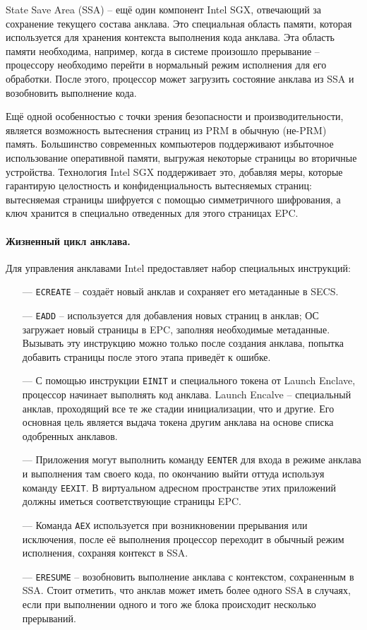State Save Area (SSA) -- ещё один компонент Intel SGX, отвечающий за сохранение текущего состава анклава. Это специальная область памяти, которая используется для хранения контекста выполнения кода анклава. Эта область памяти необходима, например, когда в системе произошло прерывание -- процессору необходимо перейти в нормальный режим исполнения для его обработки. После этого, процессор может загрузить состояние анклава из SSA и возобновить выполнение кода.

Ещё одной особенностью с точки зрения безопасности и производительности, является возможность вытеснения страниц из PRM в обычную (не-PRM) память. Большинство современных компьютеров поддерживают избыточное использование оперативной памяти, выгружая некоторые страницы во вторичные устройства. Технология Intel SGX поддерживает это, добавляя меры, которые гарантирую целостность и конфиденциальность вытесняемых страниц: вытесняемая страницы шифруется с помощью симметричного шифрования, а ключ хранится в специально отведенных для этого страницах EPC.

\paragraph{Жизненный цикл анклава.}

Для управления анклавами Intel предоставляет набор специальных инструкций:

\begin{itemize}
	\item [---] \texttt{ECREATE} -- создаёт новый анклав и сохраняет его метаданные в SECS.
	\item [---] \texttt{EADD} -- используется для добавления новых страниц в анклав; ОС загружает новый страницы в EPC, заполняя необходимые метаданные. Вызывать эту инструкцию можно только после создания анклава, попытка добавить страницы после этого этапа приведёт к ошибке.
	\item [---] С помощью инструкции \texttt{EINIT} и специального токена от Launch Enclave, процессор начинает выполнять код анклава. Launch Encalve -- специальный анклав, проходящий все те же стадии инициализации, что и другие. Его основная цель является выдача токена другим анклава на основе списка одобренных анклавов.
	\item [---] Приложения могут выполнить команду \texttt{EENTER} для входа в режиме анклава и выполнения там своего кода, по окончанию выйти оттуда используя команду \texttt{EEXIT}. В виртуальном адресном пространстве этих приложений должны иметься соответствующие страницы EPC.
	\item [---] Команда \texttt{AEX} используется при возникновении прерывания или исключения, после её выполнения процессор переходит в обычный режим исполнения, сохраняя контекст в SSA.
	\item [---] \texttt{ERESUME} -- возобновить выполнение анклава с контекстом, сохраненным в SSA. Стоит отметить, что анклав может иметь более одного SSA в случаях, если при выполнении одного и того же блока происходит несколько прерываний.
\end{itemize}

